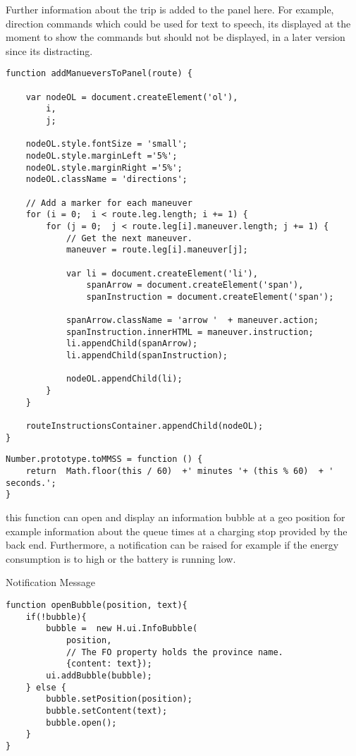 Further information about the trip is added to the panel here. For example, direction commands which could be used for text to speech, its displayed at the moment to show the commands but should not be displayed, in a later version since its distracting.

\begin{verbatim}
function addManueversToPanel(route) {

    var nodeOL = document.createElement('ol'),
        i,
        j;

    nodeOL.style.fontSize = 'small';
    nodeOL.style.marginLeft ='5%';
    nodeOL.style.marginRight ='5%';
    nodeOL.className = 'directions';

    // Add a marker for each maneuver
    for (i = 0;  i < route.leg.length; i += 1) {
        for (j = 0;  j < route.leg[i].maneuver.length; j += 1) {
            // Get the next maneuver.
            maneuver = route.leg[i].maneuver[j];

            var li = document.createElement('li'),
                spanArrow = document.createElement('span'),
                spanInstruction = document.createElement('span');

            spanArrow.className = 'arrow '  + maneuver.action;
            spanInstruction.innerHTML = maneuver.instruction;
            li.appendChild(spanArrow);
            li.appendChild(spanInstruction);

            nodeOL.appendChild(li);
        }
    }

    routeInstructionsContainer.appendChild(nodeOL);
}
\end{verbatim}

\begin{verbatim}
Number.prototype.toMMSS = function () {
    return  Math.floor(this / 60)  +' minutes '+ (this % 60)  + ' seconds.';
}
\end{verbatim}

this function can open and display an information bubble at a geo position for example information about the queue times at a charging stop provided by the back end. Furthermore, a notification can be raised for example if the energy consumption is to high or the battery is running low. 

Notification Message

\begin{verbatim}
function openBubble(position, text){
    if(!bubble){
        bubble =  new H.ui.InfoBubble(
            position,
            // The FO property holds the province name.
            {content: text});
        ui.addBubble(bubble);
    } else {
        bubble.setPosition(position);
        bubble.setContent(text);
        bubble.open();
    }
}
\end{verbatim}

